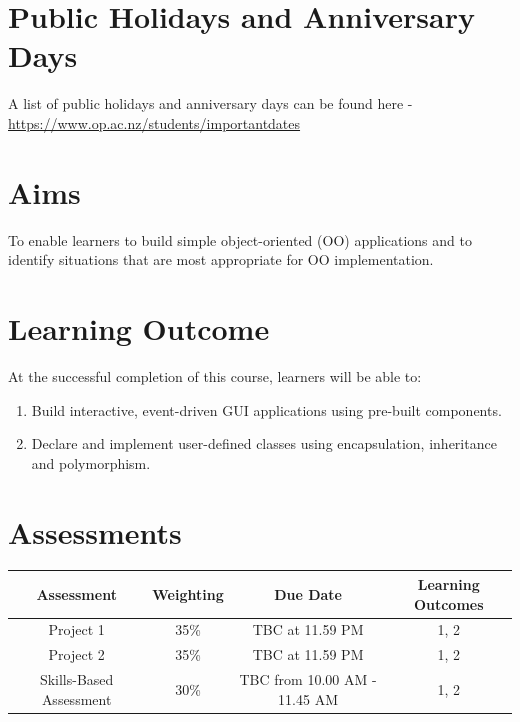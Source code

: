 \documentclass{article}
\begin{document}
\section*{Public Holidays and Anniversary Days}
A list of public holidays and anniversary days can be found here - \href{https://www.op.ac.nz/students/importantdates}{https://www.op.ac.nz/students/importantdates}

\section*{Aims}
To enable learners to build simple object-oriented (OO) applications and to identify situations that are most appropriate for OO implementation.

\section*{Learning Outcome}
At the successful completion of this course, learners will be able to:
\begin{enumerate}
	\item Build interactive, event-driven GUI applications using pre-built components.
	\item Declare and implement user-defined classes using encapsulation, inheritance and polymorphism.
\end{enumerate}

\section*{Assessments}
\renewcommand{\arraystretch}{1.5}
\begin{tabular}{|c|c|c|c|}
	\hline
	\textbf{Assessment}                                 & \textbf{Weighting} & \textbf{Due Date}            & \textbf{Learning Outcomes} \\ \hline
	\small Project 1 & \small 35\%        & \small TBC at 11.59 PM  & \small 1, 2                  \\ \hline
	\small Project 2  & \small 35\%        & \small TBC at 11.59 PM   & \small 1, 2                  \\ \hline
	\small Skills-Based Assessment                        & \small 30\%        & \small TBC from 10.00 AM - 11.45 AM & \small 1, 2                  \\ \hline
\end{tabular}
\end{document}

